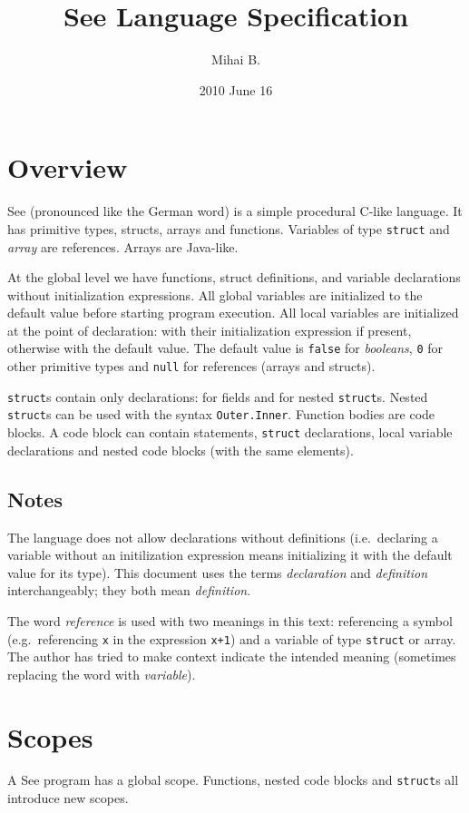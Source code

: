 \documentclass[a4paper]{article}
\begin{document}
\title{See Language Specification}
\author{Mihai B.}
\date{2010 June 16}
\maketitle

\section{Overview}
See (pronounced like the German word) is a simple procedural C-like language.
It has primitive types, structs, arrays and functions.
Variables of type \verb=struct= and \emph{array} are references.
Arrays are Java-like.

At the global level we have functions, struct definitions,
and variable declarations without initialization expressions.
All global variables are initialized to the default value
before starting program execution.
All local variables are initialized at the point of declaration:
with their initialization expression if present,
otherwise with the default value.
The default value is \verb=false= for \emph{booleans},
\verb=0= for other primitive types
and \verb=null= for references (arrays and structs).

\verb=struct=s contain only declarations:
for fields and for nested \verb=struct=s.
Nested \verb=struct=s can be used with the syntax \verb=Outer.Inner=.
Function bodies are code blocks.
A code block can contain statements, \verb=struct= declarations,
local variable declarations and nested code blocks (with the same elements).

\subsection{Notes}
The language does not allow declarations without definitions
(i.e.\ declaring a variable without an initilization expression means
initializing it with the default value for its type).
This document uses the terms \emph{declaration} and \emph{definition}
interchangeably; they both mean \emph{definition}.

The word \emph{reference} is used with two meanings in this text:
referencing a symbol (e.g.\ referencing \verb=x= in the expression \verb=x+1=)
and a variable of type \verb=struct= or array.
The author has tried to make context indicate the intended meaning
(sometimes replacing the word with \emph{variable}).


\section{Scopes}
A See program has a global scope.
Functions, nested code blocks and \verb=struct=s all introduce new scopes.
\end{document}
